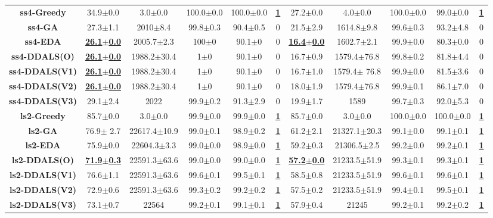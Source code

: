 \documentclass[lettersize,journal]{IEEEtran}
\begin{document}
\begin{table}[!t]
{\begin{tabular}{ccccccccccc}
        \midrule
        {\bfseries ss4-Greedy} &34.9$\pm$0.0&3.0$\pm$0.0 & 100.0$\pm$0.0&100.0$\pm$0.0 &\underline{\bfseries 1} &27.2$\pm$0.0&4.0$\pm$0.0& 100.0$\pm$0.0&99.0$\pm$0.0  &\underline{\bfseries 1} \\
        {\bfseries ss4-GA} &27.3$\pm$1.1&2010$\pm$8.4 & 99.8$\pm$0.3&90.4$\pm$0.5&0&21.5$\pm$2.9&1614.8$\pm$9.8& 99.6$\pm$0.3&93.2$\pm$4.8  &0 \\
        {\bfseries ss4-EDA} &\underline{\bfseries 26.1$\pm$0.0} &2005.7$\pm$2.3 & 100$\pm$0&90.1$\pm$0&0 &\underline{\bfseries 16.4$\pm$0.0} &1602.7$\pm$2.1& 99.9$\pm$0.0&80.3$\pm$0.0  &0 \\
        {\bfseries ss4-DDALS(O)} &\underline{\bfseries 26.1$\pm$0.0} &1988.2$\pm$30.4 & 1$\pm$0&90.1$\pm$0&0&16.7$\pm$0.9&1579.4$\pm$76.8 & 99.8$\pm$0.2&81.8$\pm$4.4&0 \\
        {\bfseries ss4-DDALS(V1)} &\underline{\bfseries 26.1$\pm$0.0} &1988.2$\pm$30.4 & 1$\pm$0&90.1$\pm$0&0&16.7$\pm$1.0&1579.4$\pm$ 76.8& 99.9$\pm$0.0&81.5$\pm$3.6  &0 \\
        {\bfseries ss4-DDALS(V2)} &\underline{\bfseries 26.1$\pm$0.0} &1988.2$\pm$30.4 & 1$\pm$0&90.1$\pm$0&0&18.0$\pm$1.9&1579.4$\pm$76.8& 99.9$\pm$0.1&86.1$\pm$7.0  &0 \\
        {\bfseries ss4-DDALS(V3)} &29.1$\pm$2.4&2022 & 99.9$\pm$0.2&91.3$\pm$2.9&0&19.9$\pm$1.7&1589& 99.7$\pm$0.3&92.0$\pm$5.3  &0 \\
        
        \midrule
        {\bfseries ls2-Greedy} &85.7$\pm$0.0&3.0$\pm$0.0 & 99.9$\pm$0.0&99.9$\pm$0.0 &\underline{\bfseries 1} &85.7$\pm$0.0&3.0$\pm$0.0& 100.0$\pm$0.0&100.0$\pm$0.0  &\underline{\bfseries 1} \\
        {\bfseries ls2-GA} &76.9$\pm$ 2.7&22617.4$\pm$10.9 & 99.0$\pm$0.1&98.9$\pm$0.2 &\underline{\bfseries 1} &61.2$\pm$2.1&21327.1$\pm$20.3& 99.1$\pm$0.0&99.1$\pm$0.1  &\underline{\bfseries 1} \\
        {\bfseries ls2-EDA} &75.9$\pm$0.0&22604.3$\pm$3.3 & 99.0$\pm$0.0&98.9$\pm$0.0 &\underline{\bfseries 1} &59.2$\pm$0.3&21306.5$\pm$2.5& 99.2$\pm$0.0&99.2$\pm$0.1  &\underline{\bfseries 1} \\
        {\bfseries ls2-DDALS(O)} &\underline{\bfseries 71.9$\pm$0.3} &22591.3$\pm$63.6 & 99.0$\pm$0.0&99.0$\pm$0.0 &\underline{\bfseries 1} &\underline{\bfseries 57.2$\pm$0.0} &21233.5$\pm$51.9& 99.3$\pm$0.1&99.3$\pm$0.1  &\underline{\bfseries 1} \\
        {\bfseries ls2-DDALS(V1)} &76.6$\pm$1.1&22591.3$\pm$63.6 & 99.6$\pm$0.1&99.5$\pm$0.1 &\underline{\bfseries 1} &58.5$\pm$0.8&21233.5$\pm$51.9& 99.6$\pm$0.1&99.6$\pm$0.1  &\underline{\bfseries 1} \\
        {\bfseries ls2-DDALS(V2)} &72.9$\pm$0.6&22591.3$\pm$63.6 & 99.3$\pm$0.2&99.2$\pm$0.2 &\underline{\bfseries 1} &57.5$\pm$0.2&21233.5$\pm$51.9& 99.4$\pm$0.1&99.5$\pm$0.1  &\underline{\bfseries 1} \\
        {\bfseries ls2-DDALS(V3)} &73.1$\pm$0.7&22564 & 99.2$\pm$0.1&99.1$\pm$0.1 &\underline{\bfseries 1} &57.9$\pm$0.4&21245& 99.2$\pm$0.1&99.2$\pm$0.2  &\underline{\bfseries 1} \\
        

\end{tabular}}
\end{table}
\end{document}
